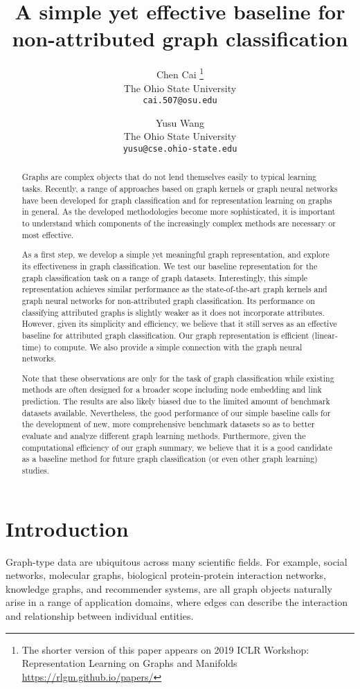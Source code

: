 \documentclass[11pt,onecolumn]{article}
\title{A simple yet effective baseline for non-attributed graph classification}
\author{Chen Cai \footnote{The shorter version of this paper appears on 2019 ICLR Workshop: Representation Learning on Graphs and Manifolds \url{https://rlgm.github.io/papers/}}\\
The Ohio State University\\
\texttt{cai.507@osu.edu} \\
\and
Yusu Wang  \\
The Ohio State University\\
\texttt{yusu@cse.ohio-state.edu} \\
}
\date{}
\begin{document}
\maketitle
\begin{abstract}
Graphs are complex objects that do not lend themselves easily to typical learning tasks. Recently, a range of approaches based on graph kernels or graph neural networks have been developed for graph classification and for representation learning on graphs in general. As the developed methodologies become more sophisticated, it is important to understand which components of the increasingly complex methods are necessary or most effective.

As a first step, we develop a simple yet meaningful graph representation, and explore its effectiveness in graph classification. We test our baseline representation for the graph classification task on a range of graph datasets.  Interestingly, this simple representation achieves similar performance as the state-of-the-art graph kernels and graph neural networks for non-attributed graph classification. Its performance on classifying attributed graphs is slightly weaker as it does not incorporate attributes. However, given its simplicity and efficiency, we believe that it still serves as an effective baseline for attributed graph classification. Our graph representation is efficient (linear-time) to compute. We also provide a simple connection with the graph neural networks.

Note that these observations are only for the task of graph classification while existing methods are often designed for a broader scope including node embedding and link prediction. The results are also likely biased due to the limited amount of benchmark datasets available.  Nevertheless, the good performance of our simple baseline calls for the development of new, more comprehensive benchmark datasets so as to better evaluate and analyze different graph learning methods. Furthermore, given the computational efficiency of our graph summary, we believe that it is a good candidate as a baseline method for future graph classification (or even other graph learning) studies.     
\end{abstract} 

\section{Introduction}
Graph-type data are ubiquitous across many scientific fields. For example, social networks, molecular graphs, biological protein-protein interaction networks, knowledge graphs, and recommender systems, are all graph objects naturally arise in a range of application domains, where edges can describe the interaction and relationship between individual entities. 
\end{document}
